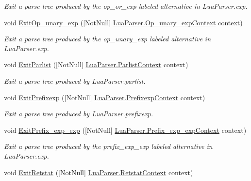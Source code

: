 \begin{DoxyCompactItemize}
\begin{DoxyCompactList}\small\item\em Exit a parse tree produced by the {\ttfamily op\+\_\+or\+\_\+exp} labeled alternative in Lua\+Parser.\+exp. \end{DoxyCompactList}\item 
void \mbox{\hyperlink{classzlua_1_1_compiler_a7a151e5694262777eecc12f51f1eb1a5}{Exit\+Op\+\_\+unary\+\_\+exp}} (\mbox{[}Not\+Null\mbox{]} \mbox{\hyperlink{classzlua_1_1_lua_parser_1_1_op__unary__exp_context}{Lua\+Parser.\+Op\+\_\+unary\+\_\+exp\+Context}} context)
\begin{DoxyCompactList}\small\item\em Exit a parse tree produced by the {\ttfamily op\+\_\+unary\+\_\+exp} labeled alternative in Lua\+Parser.\+exp. \end{DoxyCompactList}\item 
void \mbox{\hyperlink{classzlua_1_1_compiler_a90fc72d7a58e9c5d6386366362ceb0c8}{Exit\+Parlist}} (\mbox{[}Not\+Null\mbox{]} \mbox{\hyperlink{classzlua_1_1_lua_parser_1_1_parlist_context}{Lua\+Parser.\+Parlist\+Context}} context)
\begin{DoxyCompactList}\small\item\em Exit a parse tree produced by Lua\+Parser.\+parlist. \end{DoxyCompactList}\item 
void \mbox{\hyperlink{classzlua_1_1_compiler_aaed669e9529c2da870c27a0c3569651f}{Exit\+Prefixexp}} (\mbox{[}Not\+Null\mbox{]} \mbox{\hyperlink{classzlua_1_1_lua_parser_1_1_prefixexp_context}{Lua\+Parser.\+Prefixexp\+Context}} context)
\begin{DoxyCompactList}\small\item\em Exit a parse tree produced by Lua\+Parser.\+prefixexp. \end{DoxyCompactList}\item 
void \mbox{\hyperlink{classzlua_1_1_compiler_a4ce4dbd75b95a42421f7686f9ff35382}{Exit\+Prefix\+\_\+exp\+\_\+exp}} (\mbox{[}Not\+Null\mbox{]} \mbox{\hyperlink{classzlua_1_1_lua_parser_1_1_prefix__exp__exp_context}{Lua\+Parser.\+Prefix\+\_\+exp\+\_\+exp\+Context}} context)
\begin{DoxyCompactList}\small\item\em Exit a parse tree produced by the {\ttfamily prefix\+\_\+exp\+\_\+exp} labeled alternative in Lua\+Parser.\+exp. \end{DoxyCompactList}\item 
void \mbox{\hyperlink{classzlua_1_1_compiler_a53f999661996b7f9c09c021b55545d53}{Exit\+Retstat}} (\mbox{[}Not\+Null\mbox{]} \mbox{\hyperlink{classzlua_1_1_lua_parser_1_1_retstat_context}{Lua\+Parser.\+Retstat\+Context}} context)

\end{DoxyCompactItemize}
